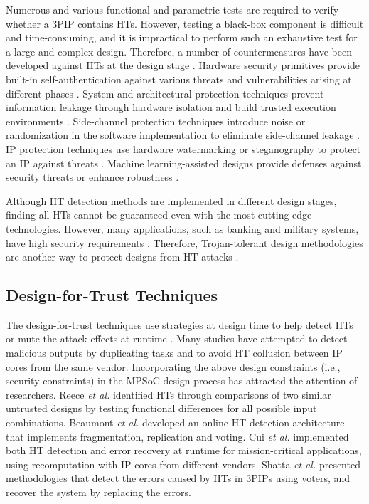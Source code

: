 \documentclass[10pt,journal, compsoc]{IEEEtran}
\begin{document}
Numerous and various functional and parametric tests are required to verify whether a 3PIP contains HTs. However, testing a black-box component is difficult and time-consuming, and it is impractical to perform such an exhaustive test for a large and complex design. Therefore, a number of countermeasures have been developed against HTs at the design stage \cite{article:WH}. Hardware security primitives provide built-in self-authentication against various threats and vulnerabilities arising at different phases \cite{article:DM}. System and architectural protection techniques prevent information leakage through hardware isolation and build trusted execution environments \cite{article:NH}. Side-channel protection techniques introduce noise or randomization in the software implementation to eliminate side-channel leakage \cite{conference:HK}. IP protection techniques use hardware watermarking or steganography to protect an IP against threats \cite{article:AS1}. Machine learning-assisted designs provide defenses against security threats or enhance robustness \cite{article:SY1}.

Although HT detection methods are implemented in different design stages, finding all HTs cannot be guaranteed even with the most cutting-edge technologies. However, many applications, such as banking and military systems, have high security requirements \cite{conference:XZ}. Therefore, Trojan-tolerant design methodologies are another way to protect designs from HT attacks \cite{article:KX}.


\subsection{Design-for-Trust Techniques}



The design-for-trust techniques use strategies at design time to help detect HTs or mute the attack effects at runtime \cite{article:JR3}. Many studies have attempted to detect malicious outputs by duplicating tasks and to avoid HT collusion between IP cores from the same vendor. Incorporating the above design constraints (i.e., security constraints) in the MPSoC design process has attracted the attention of researchers. Reece \textit{et al.} \cite{article:TR} identified HTs through comparisons of two similar untrusted designs by testing functional differences for all possible input combinations. Beaumont \textit{et al.} \cite{conference:MB} developed an online HT detection architecture that implements fragmentation, replication and voting. Cui \textit{et al.} \cite{conference:XC} implemented both HT detection and error recovery at runtime for mission-critical applications, using recomputation with IP cores from different vendors. Shatta \textit{et al.} \cite{conference:MS} presented methodologies that detect the errors caused by HTs in 3PIPs using voters, and recover the system by replacing the errors.
\end{document}
